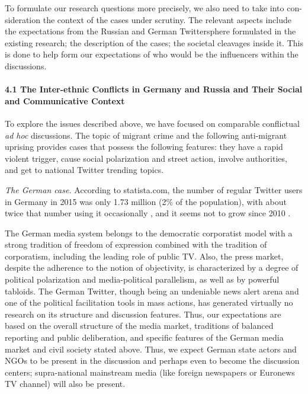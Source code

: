To formulate our research questions more precisely, we also need to take into con- sideration the context of the cases under scrutiny. The relevant aspects include the expectations from the Russian and German Twittersphere formulated in the existing research; the description of the cases; the societal cleavages inside it. This is done to help form our expectations of who would be the influencers within the discussions.

\paragraph{4.1 The Inter-ethnic Conflicts in Germany and Russia and Their Social and Communicative Context} 

To explore the issues described above, we have focused on comparable conflictual \textit{ad hoc} discussions. The topic of migrant crime and the following anti-migrant uprising provides cases that possess the following features: they have a rapid violent trigger, cause social polarization and street action, involve authorities, and get to national Twitter trending topics.

\textit{The German case.} According to statista.com, the number of regular Twitter users in Germany in 2015 was only 1.73 million (2\% of the population), with about twice that number using it occasionally \cite{Kissane}, and it seems not to grow since 2010 \cite{TumasjanSprengerSadner}.

The German media system belongs to the democratic corporatist model \cite{HallinMancini} with a strong tradition of freedom of expression combined with the tradition of corporatism, including the leading role of public TV. Also, the press market, despite the adherence to the notion of objectivity, is characterized by a degree of political polarization and media-political parallelism, as well as by powerful tabloids. The German Twitter, though being an undeniable news alert arena and one of the political facilitation tools in mass actions, has generated virtually no research on its structure and discussion features. Thus, our expectations are based on the overall structure of the media market, traditions of balanced reporting and public deliberation, and specific features of the German media market and civil society stated above. Thus, we expect German state actors and NGOs to be present in the discussion and perhaps even to become the discussion centers; supra-national mainstream media (like foreign newspapers or Euronews TV channel) will also be present.

